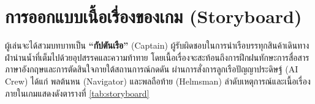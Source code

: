 
\section{การออกแบบเนื้อเรื่องของเกม (Storyboard)}

ผู้เล่นจะได้สวมบทบาทเป็น \textbf{``กัปตันเรือ''} (Captain) ผู้รับผิดชอบในการนำเรือบรรทุกสินค้าเดินทางฝ่าน่านน้ำที่เต็มไปด้วยอุปสรรคและความท้าทาย โดยเนื้อเรื่องจะสะท้อนถึงการฝึกฝนทักษะการสื่อสารภาษาอังกฤษและการตัดสินใจภายใต้สถานการณ์กดดัน ผ่านการสั่งการลูกเรือปัญญาประดิษฐ์ (AI Crew) ได้แก่ พลต้นหน (Navigator) และพลถือท้าย (Helmsman) ลำดับเหตุการณ์และเนื้อเรื่องภายในเกมแสดงดังตารางที่ \ref{tab:storyboard}

